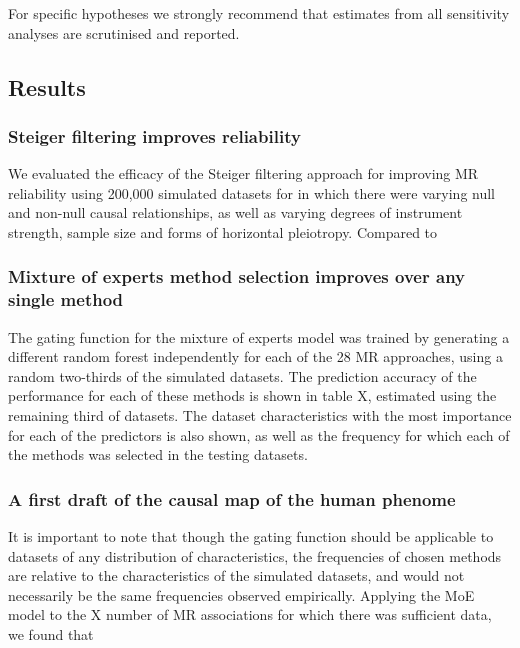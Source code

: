 \documentclass[]{article}
\begin{document}
For specific hypotheses we strongly recommend that estimates from all
sensitivity analyses are scrutinised and reported.

\subsection{Results}\label{results}

\subsubsection{Steiger filtering improves
reliability}\label{steiger-filtering-improves-reliability}

We evaluated the efficacy of the Steiger filtering approach for
improving MR reliability using 200,000 simulated datasets for in which
there were varying null and non-null causal relationships, as well as
varying degrees of instrument strength, sample size and forms of
horizontal pleiotropy. Compared to

\subsubsection{Mixture of experts method selection improves over any
single
method}\label{mixture-of-experts-method-selection-improves-over-any-single-method}

The gating function for the mixture of experts model was trained by
generating a different random forest independently for each of the 28 MR
approaches, using a random two-thirds of the simulated datasets. The
prediction accuracy of the performance for each of these methods is
shown in table X, estimated using the remaining third of datasets. The
dataset characteristics with the most importance for each of the
predictors is also shown, as well as the frequency for which each of the
methods was selected in the testing datasets.

\subsubsection{A first draft of the causal map of the human
phenome}\label{a-first-draft-of-the-causal-map-of-the-human-phenome}

It is important to note that though the gating function should be
applicable to datasets of any distribution of characteristics, the
frequencies of chosen methods are relative to the characteristics of the
simulated datasets, and would not necessarily be the same frequencies
observed empirically. Applying the MoE model to the X number of MR
associations for which there was sufficient data, we found that
\end{document}

